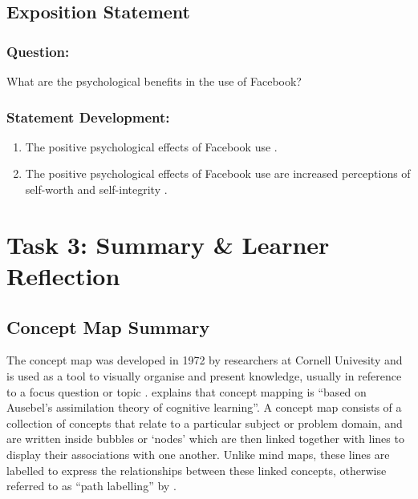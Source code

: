 \documentclass[12pt,a4paper]{report}
\begin{document}
\subsection*{\textsf{Exposition Statement}}

\subsubsection*{\textsf{Question:}}
What are the psychological benefits in the use of Facebook?

\subsubsection*{\textsf{Statement Development:}}
\begin{enumerate}
\item The positive psychological effects of Facebook use \citep{Toma2013}.
\item The positive psychological effects of Facebook use are increased perceptions of self-worth and self-integrity \citep{Toma2013}.
\end{enumerate}

\newpage
\section*{\textsf{Task 3: Summary \& Learner Reflection}}

\subsection*{\textsf{Concept Map Summary}}
The concept map was developed in 1972 by researchers at Cornell Univesity and is used as a tool to visually organise and present knowledge, usually in reference to a focus question or topic \citep{Novak2006, Hilbert2009}. \citet[pp. 267]{Hilbert2009} explains that concept mapping is ``based on Ausebel's assimilation theory of cognitive learning''. A concept map consists of a collection of concepts that relate to a particular subject or problem domain, and are written inside bubbles or `nodes' which are then linked together with lines to display their associations with one another. Unlike mind maps, these lines are labelled to express the relationships between these linked concepts, otherwise referred to as ``path labelling'' by \citet[pp. 790]{Rodriguez-Priego2013}.\\
\end{document}

